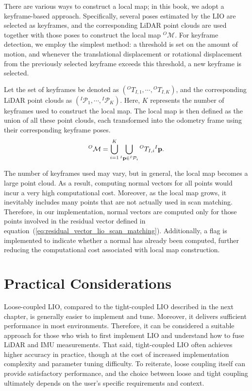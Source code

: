 There are various ways to construct a local map; in this book, we adopt a keyframe-based approach.
Specifically, several poses estimated by the LIO are selected as keyframes, and the corresponding LiDAR point clouds are used together with those poses to construct the local map ${}^{O}\mathcal{M}$.
For keyframe detection, we employ the simplest method: a threshold is set on the amount of motion, and whenever the translational displacement or rotational displacement from the previously selected keyframe exceeds this threshold, a new keyframe is selected.

Let the set of keyframes be denoted as $\left( {}^{O}T_{I, 1}, \cdots, {}^{O}T_{I, K} \right)$, and the corresponding LiDAR point clouds as $\left( {}^{I}\mathcal{P}_{1}, \cdots, {}^{I}\mathcal{P}_{K} \right)$.
Here, $K$ represents the number of keyframes used to construct the local map.
The local map is then defined as the union of all these point clouds, each transformed into the odometry frame using their corresponding keyframe poses.
%
\begin{align}
  {}^{O}\mathcal{M} = \bigcup_{i=1}^{K} \bigcup_{{}^{I}{\bf p} \in {}^{I}\mathcal{P}_{i}} {}^{O}T_{I, i} {}^{I}{\bf p}.
\end{align}
%

The number of keyframes used may vary, but in general, the local map becomes a large point cloud.
As a result, computing normal vectors for all points would incur a very high computational cost.
Moreover, as the local map grows, it inevitably includes many points that are not actually used in scan matching.
Therefore, in our implementation, normal vectors are computed only for those points involved in the residual vector defined in equation~(\ref{eq:residual_vector_lio_scan_matching}).
Additionally, a flag is implemented to indicate whether a normal has already been computed, further reducing the computational cost associated with local map construction.














\section{Practical Considerations}

Loose-coupled LIO, compared to the tight-coupled LIO described in the next chapter, is generally easier to implement and tune.
Moreover, it delivers sufficient performance in most environments.
Therefore, it can be considered a suitable approach for those who wish to first implement LIO and understand how to fuse LiDAR and IMU measurements.
That said, tight-coupled LIO often achieves higher accuracy in practice, though at the cost of increased implementation complexity and parameter tuning difficulty.
To reiterate, loose coupling itself can provide satisfactory performance, and the choice between loose and tight coupling ultimately depends on the user's specific requirements and context.

